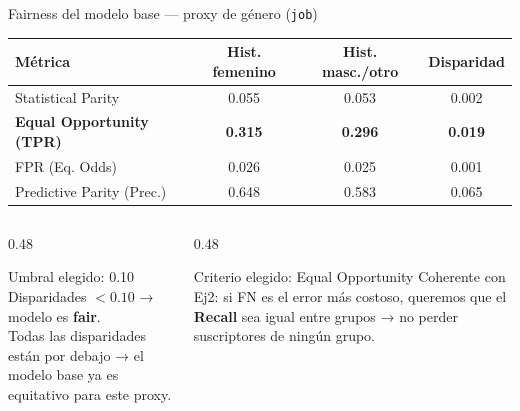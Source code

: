 \documentclass[aspectratio=169, 11pt]{beamer}
\begin{document}
\begin{frame}{Fairness del modelo base — proxy de género (\texttt{job})}
\begin{center}
\begin{tabular}{l c c c}
\toprule
\textbf{Métrica} & \textbf{Hist. femenino} & \textbf{Hist. masc./otro} & \textbf{Disparidad} \\
\midrule
\rowcolor{gris10} Statistical Parity & 0.055 & 0.053 & 0.002 \\
\textbf{Equal Opportunity (TPR)} & \textbf{0.315} & \textbf{0.296} & \textbf{0.019} \\
\rowcolor{gris10} FPR (Eq. Odds) & 0.026 & 0.025 & 0.001 \\
Predictive Parity (Prec.) & 0.648 & 0.583 & 0.065 \\
\bottomrule
\end{tabular}
\end{center}
\vspace{6pt}
\begin{columns}[T]
\begin{column}{0.48\textwidth}
\begin{block}{Umbral elegido: 0.10}
Disparidades $< 0.10$ → modelo es \textbf{fair}.\\
Todas las disparidades están por debajo → el modelo base ya es equitativo para este proxy.
\end{block}
\end{column}
\begin{column}{0.48\textwidth}
\begin{alertblock}{Criterio elegido: Equal Opportunity}
Coherente con Ej2: si FN es el error más costoso, queremos que el \textbf{Recall} sea igual entre grupos → no perder suscriptores de ningún grupo.
\end{alertblock}
\end{column}
\end{columns}
\end{frame}
\end{document}
